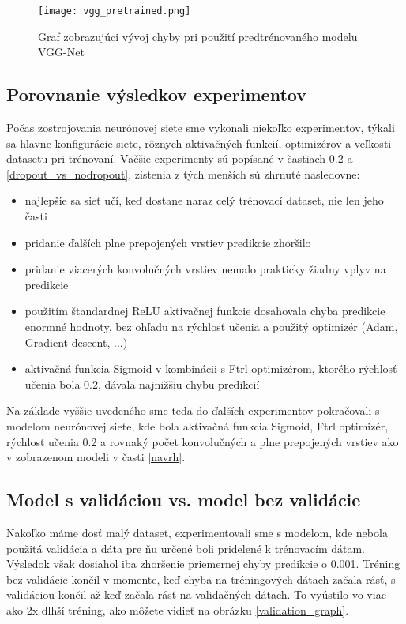 \begin{figure}[H]
	\begin{center}
		\texttt{[image: vgg\_pretrained.png]}
		\caption[Vývoj chyby počas trénovanie siete s predtrénovaným modelom VGG-Net]{
			Graf zobrazujúci vývoj chyby pri použití predtrénovaného modelu VGG-Net
		}\label{vgg_pretrained_loss}
	\end{center}
\end{figure}

\subsection{Porovnanie výsledkov experimentov}
\iffalse
Počas zostrojovania neurónovej siete sme vykonali niekoľko experimentov, týkali sa hlavne konfigurácie siete, rôznych aktivačných funkcií, optimizérov a veľkosti datasetu pri trénovaní. Väčšie experimenty sú popísané v častiach \ref{val_vs_noval} a \ref{dropout_vs_nodropout}, zistenia z tých menších sú zhrnuté nasledovne:

\begin{itemize}
	\item najlepšie sa sieť učí, keď dostane naraz celý trénovací dataset, nie len jeho časti
	\item pridanie ďalších plne prepojených vrstiev predikcie zhoršilo
	\item pridanie viacerých konvolučných vrstiev nemalo prakticky žiadny vplyv na predikcie
	\item použitím štandardnej ReLU aktivačnej funkcie dosahovala chyba predikcie enormné hodnoty, bez ohľadu na rýchlosť učenia a použitý optimizér (Adam, Gradient descent, ...)
	\item aktivačná funkcia Sigmoid v kombinácii s Ftrl optimizérom, ktorého rýchlosť učenia bola 0.2, dávala najnižšiu chybu predikcií
\end{itemize}

Na základe vyššie uvedeného sme teda do ďalších experimentov pokračovali s modelom neurónovej siete, kde bola aktivačná funkcia Sigmoid, Ftrl optimizér, rýchlosť učenia 0.2 a rovnaký počet konvolučných a plne prepojených vrstiev ako v zobrazenom modeli v časti \ref{navrh}.

\subsection{Model s validáciou vs. model bez validácie}
\label{val_vs_noval}
Nakoľko máme dosť malý dataset, experimentovali sme s modelom, kde nebola použitá validácia a dáta pre ňu určené boli pridelené k trénovacím dátam. Výsledok však dosiahol iba zhoršenie priemernej chyby predikcie o 0.001. Tréning bez validácie končil v momente, keď chyba na tréningových dátach začala rásť, s validáciou končil až keď začala rásť na validačných dátach. To vyústilo vo viac ako 2x dlhší tréning, ako môžete vidieť na obrázku \ref{validation_graph}. 

